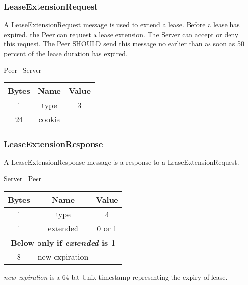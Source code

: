 \subsubsection{LeaseExtensionRequest}

A LeaseExtensionRequest message is used to extend a lease. Before a lease has expired, the Peer can
request a lease extension. The Server can accept or deny this request. The Peer SHOULD send this message no earlier
than as soon as 50 percent of the lease duration has expired.

\begin{center}
    Peer \textrightarrow\ Server\\
    \begin{tabular}{|c|c|c|}
        \hline
        \textbf{Bytes} & \textbf{Name} & \textbf{Value} \\
        \hline
        1              & type          & 3              \\
        \hline
        24             & cookie        &                \\
        \hline
    \end{tabular}
\end{center}

\subsubsection{LeaseExtensionResponse}

A LeaseExtensionResponse message is a response to a LeaseExtensionRequest.

\begin{center}
    Server \textrightarrow\ Peer\\
    \begin{tabular}{|c|c|c|}
        \hline
        \textbf{Bytes} & \textbf{Name}  & \textbf{Value} \\
        \hline
        1              & type           & 4              \\
        \hline
        1              & extended       & 0 or 1         \\
        \hline
        \multicolumn{3}{|c|}{\textbf{Below only if \emph{extended} is 1} } \\
        \hline
        8              & new-expiration &                \\
        \hline
    \end{tabular}
\end{center}

\emph{new-expiration} is a 64 bit Unix timestamp representing the expiry of lease.

